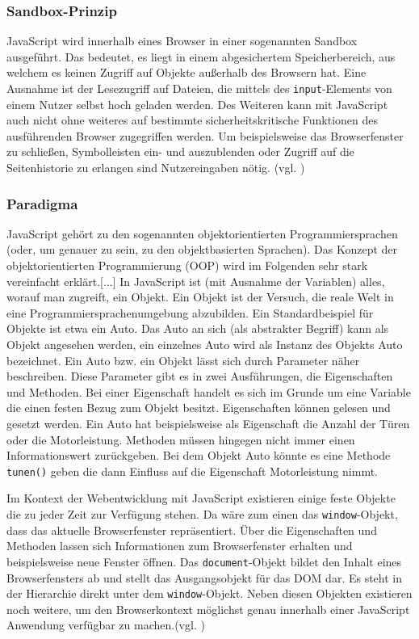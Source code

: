 \subsubsection{Sandbox-Prinzip} JavaScript wird innerhalb eines Browser in einer sogenannten Sandbox ausgeführt. Das bedeutet, es liegt in einem abgesichertem Speicherbereich, aus welchem es keinen Zugriff auf Objekte außerhalb des Browsern hat. Eine Ausnahme ist der Lesezugriff auf Dateien, die mittels des \texttt{input}-Elements von einem Nutzer selbst hoch geladen werden. Des Weiteren kann mit JavaScript auch nicht ohne weiteres auf bestimmte sicherheitskritische Funktionen des ausführenden Browser zugegriffen werden. Um beispielsweise das Browserfenster zu schließen, Symbolleisten ein- und auszublenden oder Zugriff auf die Seitenhistorie zu erlangen sind Nutzereingaben nötig. (vgl. \cite{WikiJS2014})

\subsubsection{Paradigma} \glqq JavaScript gehört zu den sogenannten objektorientierten Programmiersprachen (oder, um genauer zu sein, zu den objektbasierten Sprachen). Das Konzept der objektorientierten Programmierung (OOP) wird im Folgenden sehr stark vereinfacht erklärt.[...] In JavaScript ist (mit Ausnahme der Variablen) alles, worauf man zugreift, ein Objekt. Ein Objekt ist der Versuch, die reale Welt in eine Programmiersprachenumgebung abzubilden. Ein Standardbeispiel für Objekte ist etwa ein Auto. Das Auto an sich (als abstrakter Begriff) kann als Objekt angesehen werden, ein einzelnes Auto wird als Instanz des Objekts Auto bezeichnet.\grqq{}\cite[S.93]{WenzJava2008} Ein Auto bzw. ein Objekt lässt sich durch Parameter näher beschreiben. Diese Parameter gibt es in zwei Ausführungen, die Eigenschaften und Methoden. Bei einer Eigenschaft handelt es sich im Grunde um eine Variable die einen festen Bezug zum Objekt besitzt. Eigenschaften können gelesen und gesetzt werden. Ein Auto hat beispielsweise als Eigenschaft die Anzahl der Türen oder die Motorleistung. Methoden müssen hingegen nicht immer einen Informationswert zurückgeben. Bei dem Objekt Auto könnte es eine Methode \texttt{tunen()} geben die dann Einfluss auf die Eigenschaft Motorleistung nimmt.\par Im Kontext der Webentwicklung mit JavaScript existieren einige feste Objekte die zu jeder Zeit zur Verfügung stehen. Da wäre zum einen das \texttt{window}-Objekt, dass das aktuelle Browserfenster repräsentiert. Über die Eigenschaften und Methoden lassen sich Informationen zum Browserfenster erhalten und beispielsweise neue Fenster öffnen. Das \texttt{document}-Objekt bildet den Inhalt eines Browserfensters ab und stellt das Ausgangsobjekt für das DOM dar. Es steht in der Hierarchie direkt unter dem \texttt{window}-Objekt. Neben diesen Objekten existieren noch weitere, um den Browserkontext möglichst genau innerhalb einer JavaScript Anwendung verfügbar zu machen.(vgl. \cite{SelfHtml20147})

